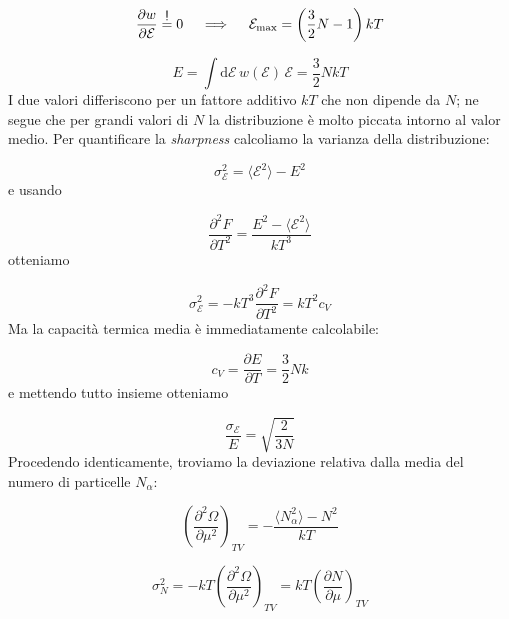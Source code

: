 \documentclass[a4paper]{report}
\newcommand\impongo{\mathrel{\overset{\makebox[0pt]{\mbox{\normalfont\sffamily !}}}{=}}}
\begin{document}
\begin{equation}
   \frac{\partial w}{\partial\mathcal{E}} \impongo 0 \quad \implies \quad \mathcal{E}_{\text{max}} =  \left(\frac{3}{2}N-1\right) k T
\end{equation}

\begin{equation}
    E = \int \mathrm{d}\mathcal{E}\,w(\mathcal{E})\,\mathcal{E} = \frac{3}{2}N k T
\end{equation}
I due valori differiscono per un fattore additivo $k T$ che non dipende da $N$; ne segue che per grandi valori di $N$ la distribuzione è molto piccata intorno al valor medio. Per quantificare la \textit{sharpness} calcoliamo la varianza della distribuzione:

\begin{equation}
    \sigma_{\mathcal{E}}^2 = \langle\mathcal{E}^2\rangle - E^2
\end{equation}
e usando

\begin{equation}
    \frac{\partial^2 F}{\partial T^2} = \frac{E^2 - \langle\mathcal{E}^2\rangle}{k T^3}
\end{equation}
otteniamo

\begin{equation}
     \sigma_{\mathcal{E}}^2 = -k T^3 \frac{\partial^2 F}{\partial T^2} = k T^2 c_V
     \label{RMSenergia}
\end{equation}
Ma la capacità termica media è immediatamente calcolabile:

\begin{equation}
    c_V = \frac{\partial E}{\partial T} = \frac{3}{2} N k
\end{equation}
e mettendo tutto insieme otteniamo

\begin{equation}
    \frac{\sigma_\mathcal{E}}{E} = \sqrt{\frac{2}{3N}}
\end{equation}
Procedendo identicamente, troviamo la deviazione relativa dalla media del numero di particelle $N_\alpha$:

\begin{equation}
    \left(\frac{\partial^2 \Omega}{\partial\mu^2}\right)_{TV} = -\frac{\langle N_\alpha^2\rangle-N^2}{k T}
\end{equation}

\begin{equation}
    \sigma_N^2 = - k T \left(\frac{\partial^2 \Omega}{\partial\mu^2}\right)_{TV}= k T \left(\frac{\partial N}{\partial\mu}\right)_{TV}
\end{equation}
\end{document}
